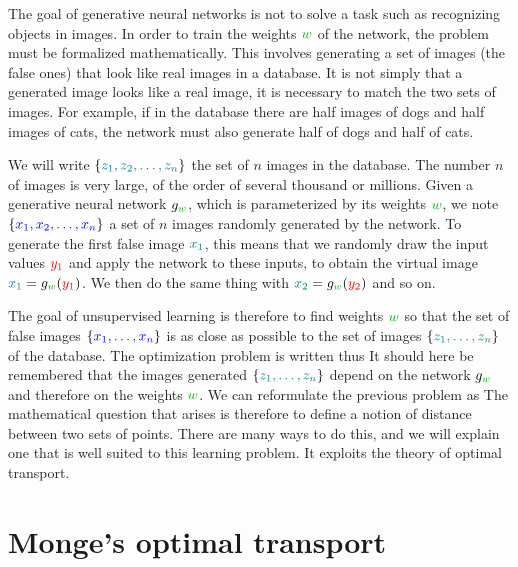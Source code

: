 The goal of generative neural networks is not to solve a task such as recognizing objects in images.
%
In order to train the weights $\mygreen{w}$ of the network, the problem must be formalized mathematically. This involves generating a set of  images (the false ones) that look like real images in a database. It is not simply that a generated image looks like a real image, it is necessary to match the two sets of images. For example, if in the database there are half images of dogs and half images of cats, the network must also generate half of dogs and half of cats.

We will write $\{\mylblue{z_1, z_2, \ldots, z_n}\}$ the set of $n$ images in the database. The number $n$ of images is very large, of the order of several thousand or millions. Given a generative neural network $g_{\mygreen{w}}$, which is parameterized by its weights $\mygreen{w}$, we note $\{\myblue{x_1, x_2, \ldots, x_n} \}$ a set of $n$  images randomly generated by the network. To generate the first false image $\mylblue{x_1}$, this means that we randomly draw the input values ${\color{red} y_1}$ and apply the network to these inputs, to obtain the virtual image $\mylblue{x_1} = g_{\mygreen{w}}({\color{red} y_1})$. We then do the same thing with $\mylblue{x_2} = g_{\mygreen{w}} ({\color{red} y_2})$ and so on.

The goal of unsupervised learning is therefore to find weights $\mygreen{w}$ so that the set of false images $\{\myblue{x_1, \ldots, x_n} \}$ is as close as possible to the set of images $\{\mylblue{z_1, \ldots, z_n}\}$ of the database. The optimization problem is written thus
It should here be remembered that the images generated $\{\mylblue{z_1, \ldots, z_n} \}$ depend on the network $g_{\mygreen{w}}$ and therefore on the weights $\mygreen{w}$. We can reformulate the previous problem as
%
The mathematical question that arises is therefore to define a notion of distance between two sets of points. There are many ways to do this, and we will explain one that is well suited to this learning problem.
%
It exploits the theory of optimal transport.


\section{Monge's optimal transport}
\label{sec-ot}

